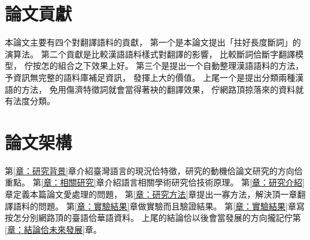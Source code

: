 \section{論文貢獻}
\label{節：論文貢獻}
本論文主要有四个對翻譯語料的貢獻，
第一个是本論文提出「拄好長度斷詞」的演算法。
第二个貢獻是比較漢語語料樣式對翻譯的影響，
比較斷詞佮斷字翻譯模型，
佇按怎的組合之下效果上好。
第三个是提出一个自動整理漢語語料的方法，
予資訊無完整的語料庫補足資訊，
發揮上大的價值。
上尾一个是提出分類兩種漢語的方法，
免用傷濟特徵詞就會當得著袂的翻譯效果，
佇網路頂掠落來的資料就有法度分類。

\section{論文架構}
\label{節：論文架構}

第\ref{章：研究背景}章介紹臺灣語言的現況佮特徵，研究的動機佮論文研究的方向佮重點。
第\ref{章：相關研究}章介紹語言相關學術研究佮技術原理。
第\ref{章：研究介紹}章定義本篇論文愛處理的問題，
第\ref{章：研究方法}章提出一寡方法，解決頂一章翻譯語料的問題。
第\ref{章：實驗結果}章做實驗而且驗證結果。
第\ref{章：實驗結果}章寫按怎分別網路頂的臺語佮華語資料。
上尾的結論佮以後會當發展的方向攏記佇第\ref{章：結論佮未來發展}章。
